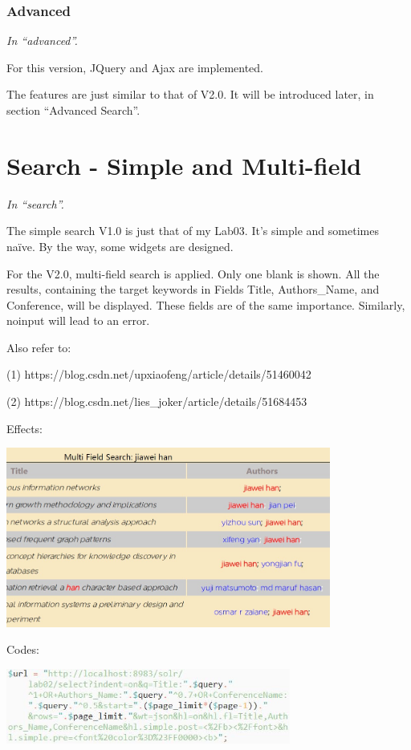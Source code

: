 \documentclass[10pt,twoside,a4paper,titlepage]{article}
\begin{document}
	\subsubsection{Advanced}
		\emph{In “advanced”.}\par
		For this version, JQuery and Ajax are implemented.\newline\par
		The features are just similar to that of V2.0. It will be introduced later, in section “Advanced Search”.


	\section{Search - Simple and Multi-field}
		\emph{In “search”.}\newline\par
		The simple search V1.0 is just that of my Lab03. It’s simple and sometimes naïve. By the way, some widgets are designed.\newline\par
		For the V2.0, multi-field search is applied. Only one blank is shown. All the results, containing the target keywords in Fields Title, Authors\_Name, and Conference, will be displayed. These fields are of the same importance. Similarly, noinput will lead to an error.\newline\par
		Also refer to:\par
		\indent\indent(1) https://blog.csdn.net/upxiaofeng/article/details/51460042\par
		\indent\indent(2) https://blog.csdn.net/lies\_joker/article/details/51684453\newline\par
		Effects:\newline\par
		\includegraphics[width=0.8\textwidth]{gzl/02.png}\newline\par
		Codes:\newline\par
		\includegraphics[width=0.7\textwidth]{gzl/02.jpg}\newline\par
\end{document}
